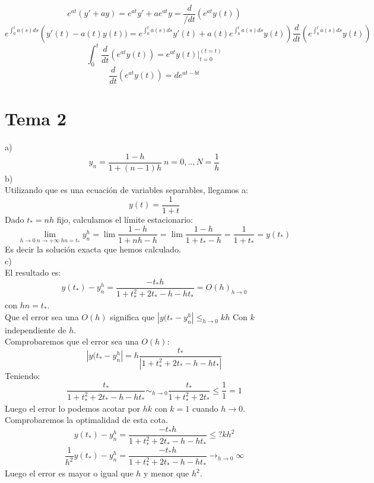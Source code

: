 \documentclass[openany]{book}
\begin{document}
    \setcounter{ex}{8}

    \begin{exercise}
        $$ e^{at}(y'+ay) = e^{at}y' + ae^{at}y = \dfrac{d}{/dt}(e^{at}y(t)) $$
        $$ e^{\int_{0}^{t}a(s)ds}\left(y'(t)-a(t)y(t)) = e^{\int_{0}^{t}a(s)ds}  y'(t)+a(t)e^{\int_{0}^{t}a(s)ds}y(t) \right) \dfrac{d}{dt}(e^{\int_{0}^{t}a(s)ds}y(t)) $$
        $$ \int_{0}^{t}\dfrac{d}{dt}(e^{at}y(t)) = e^{at}y(t)|_{t=0} ^{(t = t)} $$
        $$ \dfrac{d}{dt}(e^{at}y(t)) = d e^{at-bt} $$
    \end{exercise}

    \chapter{Tema 2}
    \setcounter{ex}{7}
    \begin{exercise}
        a)
        $$ y_n = \dfrac{1-h}{1+(n-1)h}\ n = 0,..,N = \dfrac{1}{h}$$
        b)\\
        Utilizando que es una ecuación de variables separables, llegamos a:
        $$ y(t) = \dfrac{1}{1+t}  $$
        Dado $ t_{*}= nh  $ fijo, calculamos el límite estacionario:
        $$ \lim_{h \to 0\ n\to +\infty\ hn = t_{*}}y_{n}^{h}  = \lim \dfrac{1-h}{1+nh-h} = \lim \dfrac{1-h}{1+t_{*}-h} = \dfrac{1}{1+t_{*}} = y(t_{*})$$
        Es decir la solución exacta que hemos calculado.\\
        c)\\
        El resultado es:
        $$ y(t_{*})-y_{n}^h = \dfrac{-t_{*}h}{1+t_{*}^2+2t_{*}-h-ht_{*}} = O(h)_{h \to 0}$$
        con $ hn = t_{*} $.\\
        Que el error sea una $ O(h) $ significa que $ |y(t_{*}-y_{n}^h| \leq_{h\to 0} kh $
        Con $ k $ independiente de $ h $.\\
        Comprobaremos que el error sea una $ O(h) $:
        $$ |y(t_{*}-y_n^h| = h \dfrac{t_{*}}{|1+t_{*}^2+2t_{*}-h-ht_{*}|} $$
        Teniendo:
        $$ \dfrac{t_{*}}{1+t_{*}^2+2t_{*}-h-ht_{*}}\sim _{h\to 0} \dfrac{t_{*}}{1+t_{*}^2+2t_{*}} \leq \dfrac{1}{1} = 1 $$ 
        Luego el error lo podemos acotar por $ hk $ con $ k = 1 $ cuando $ h \to 0 $.\\
        
        Comprobaremos la optimalidad de esta cota.
        $$ y(t_{*})-y_{n}^h = \dfrac{-t_{*}h}{1+t_{*}^2+2t_{*}-h-ht_{*}} \leq ? k h^2 $$
        $$ \dfrac{1}{h^2} y(t_{*})-y_{n}^h = \dfrac{-t_{*}h}{1+t_{*}^2+2t_{*}-h-ht_{*}} \to_{h\to 0} \infty $$
        Luego el error es mayor o igual que $ h $ y menor que $ h^2 $.
        

    \end{exercise}
    
\end{document}
